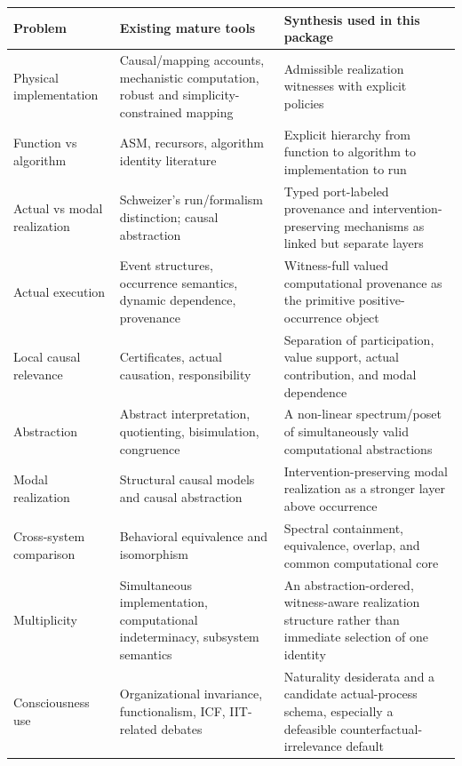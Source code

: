 \documentclass[11pt,a4paper]{article}
\begin{document}
\begin{center}
\small
\begin{tabularx}{\textwidth}{>{\RaggedRight\arraybackslash}p{} >{\RaggedRight\arraybackslash}p{} >{\RaggedRight\arraybackslash}X}
\toprule
\textbf{Problem} & \textbf{Existing mature tools} & \textbf{Synthesis used in this package}\\
\midrule
Physical implementation & Causal/mapping accounts, mechanistic computation, robust and simplicity-constrained mapping & Admissible realization witnesses with explicit policies\\
Function vs algorithm & ASM, recursors, algorithm identity literature & Explicit hierarchy from function to algorithm to implementation to run\\
Actual vs modal realization & Schweizer's run/formalism distinction; causal abstraction & Typed port-labeled provenance and intervention-preserving mechanisms as linked but separate layers\\
Actual execution & Event structures, occurrence semantics, dynamic dependence, provenance & Witness-full valued computational provenance as the primitive positive-occurrence object\\
Local causal relevance & Certificates, actual causation, responsibility & Separation of participation, value support, actual contribution, and modal dependence\\
Abstraction & Abstract interpretation, quotienting, bisimulation, congruence & A non-linear spectrum/poset of simultaneously valid computational abstractions\\
Modal realization & Structural causal models and causal abstraction & Intervention-preserving modal realization as a stronger layer above occurrence\\
Cross-system comparison & Behavioral equivalence and isomorphism & Spectral containment, equivalence, overlap, and common computational core\\
Multiplicity & Simultaneous implementation, computational indeterminacy, subsystem semantics & An abstraction-ordered, witness-aware realization structure rather than immediate selection of one identity\\
Consciousness use & Organizational invariance, functionalism, ICF, IIT-related debates & Naturality desiderata and a candidate actual-process schema, especially a defeasible counterfactual-irrelevance default\\
\bottomrule
\end{tabularx}
\end{center}
\end{document}
